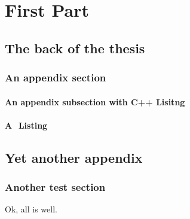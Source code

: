 \documentclass[a4paper,11pt]{MScThesis}
\begin{document}
\cleardoublepage

%
    \part{First Part} %
		




%
    


\appendix

    \chapter{The back of the thesis}

    \section{An appendix section}

    \subsection{An appendix subsection with C++ Lisitng}

    \lstset{language=C++}
    

    \subsection{A \matlab $ $ Listing}

    \lstset{language=matlab}
    

    \chapter{Yet another appendix}

    \section{Another test section}

    Ok, all is well.

    \printindex
    \cleardoublepage
\end{document}
